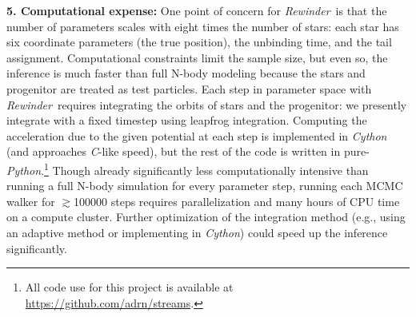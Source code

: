 \documentclass[letterpaper,12pt,preprint]{aastex}
\newcommand{\project}[1]{\textsl{#1}}
\newcommand{\gaia}{\project{Gaia}}
\newcommand{\rewinder}{\emph{Rewinder}}
\begin{document}
{\bf 5. Computational expense:} One point of concern for \rewinder\ is that the number of parameters scales with eight times the number of stars: each star has six coordinate parameters (the true position), the unbinding time, and the tail assignment. Computational constraints limit the sample size, but even so, the inference is much faster than full N-body modeling because the stars and progenitor are treated as test particles. Each step in parameter space with \rewinder\ requires integrating the orbits of stars and the progenitor: we presently integrate with a fixed timestep using leapfrog integration. Computing the acceleration due to the given potential at each step is implemented in \project{Cython} (and approaches \project{C}-like speed), but the rest of the code is written in pure-\project{Python}.\footnote{All code use for this project is available at \url{https://github.com/adrn/streams}.} Though already significantly less computationally intensive than running a full N-body simulation for every parameter step, running each MCMC walker for $\gtrsim$100000 steps requires parallelization and many hours of CPU time on a compute cluster. Further optimization of the integration method (e.g., using an adaptive method or implementing in \project{Cython}) could speed up the inference significantly. 


\end{document}
